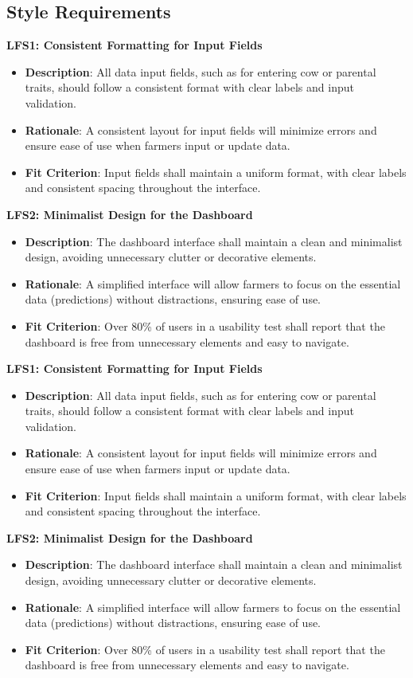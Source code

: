 \documentclass[12pt]{article}
\begin{document}
\subsection{Style Requirements}
\textbf{LFS1: Consistent Formatting for Input Fields}
\begin{itemize}
    \item \textbf{Description}: All data input fields, such as for entering 
    cow or parental traits, should follow a consistent format with clear labels 
    and input validation.
    \item \textbf{Rationale}: A consistent layout for input fields will 
    minimize errors and ensure ease of use when farmers input or update data.
    \item \textbf{Fit Criterion}: Input fields shall maintain a uniform 
    format, with clear labels and consistent spacing throughout the interface.
\end{itemize}
\textbf{LFS2: Minimalist Design for the Dashboard}
\begin{itemize}
    \item \textbf{Description}: The dashboard interface shall maintain a 
    clean and minimalist design, avoiding unnecessary clutter or decorative 
    elements.
    \item \textbf{Rationale}: A simplified interface will allow farmers to 
    focus on the essential data (predictions) without distractions, ensuring 
    ease of use.
    \item \textbf{Fit Criterion}: Over 80\% of users in a usability test 
    shall report that the dashboard is free from unnecessary elements and 
    easy to navigate.
\end{itemize}

\textbf{LFS1: Consistent Formatting for Input Fields}
\begin{itemize}
    \item \textbf{Description}: All data input fields, such as for entering 
    cow or parental traits, should follow a consistent format with clear labels 
    and input validation.
    \item \textbf{Rationale}: A consistent layout for input fields will 
    minimize errors and ensure ease of use when farmers input or update data.
    \item \textbf{Fit Criterion}: Input fields shall maintain a uniform 
    format, with clear labels and consistent spacing throughout the interface.
\end{itemize}
\textbf{LFS2: Minimalist Design for the Dashboard}
\begin{itemize}
    \item \textbf{Description}: The dashboard interface shall maintain a 
    clean and minimalist design, avoiding unnecessary clutter or decorative 
    elements.
    \item \textbf{Rationale}: A simplified interface will allow farmers to 
    focus on the essential data (predictions) without distractions, ensuring 
    ease of use.
    \item \textbf{Fit Criterion}: Over 80\% of users in a usability test 
    shall report that the dashboard is free from unnecessary elements and 
    easy to navigate.
\end{itemize}
\end{document}
